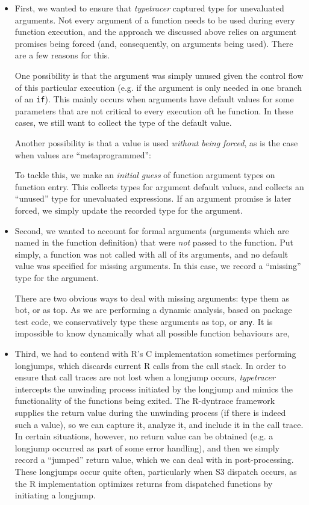 \documentclass[acmsmall,review,anonymous]{acmart}\settopmatter{printfolios=true,printccs=false,printacmref=false}
\newcommand{\code}[1]{{\lstinline[style=Rin]!#1!}\xspace}
\newcommand{\typetracer}{\emph{typetracer}\xspace} %
\begin{document}
\begin{itemize}

\item First, we wanted to ensure that \typetracer captured type for
  unevaluated arguments.  Not every argument of a function needs to be used
  during every function execution, and the approach we discussed above
  relies on argument promises being forced (and, consequently, on arguments
  being used).  There are a few reasons for this.

One possibility is that the argument was simply unused given the control
flow of this particular execution (e.g. if the argument is only needed in
one branch of an \code{if}).  This mainly occurs when arguments have default
values for some parameters that are not critical to every execution oft he
function.  In these cases, we still want to collect the type of the default
value.

Another possibility is that a value is used {\it without being forced}, as
is the case when values are ``metaprogrammed'': 

To tackle this, we make an {\it initial guess} of function argument types on
function entry. This collects types for argument default values, and
collects an ``unused'' type for unevaluated expressions.  If an argument
promise is later forced, we simply update the recorded type for the
argument.

\item Second, we wanted to account for formal arguments (arguments which are
  named in the function definition) that were {\it not} passed to the
  function.  Put simply, a function was not called with all of its
  arguments, and no default value was specified for missing arguments.  In
  this case, we record a ``missing'' type for the argument.

There are two obvious ways to deal with missing arguments: type them as bot,
or as top.  As we are performing a dynamic analysis, based on package test
code, we conservatively type these arguments as top, or \code{any}.  It is
impossible to know dynamically what all possible function behaviours are,

\item Third, we had to contend with R's C implementation sometimes
  performing longjumps, which discards current R calls from the call stack.
  In order to ensure that call traces are not lost when a longjump occurs,
  \typetracer intercepts the unwinding process initiated by the longjump and
  mimics the functionality of the functions being exited.  The R-dyntrace
  framework supplies the return value during the unwinding process (if there
  is indeed such a value), so we can capture it, analyze it, and include it
  in the call trace.  In certain situations, however, no return value can be
  obtained (e.g. a longjump occurred as part of some error handling), and
  then we simply record a ``jumped'' return value, which we can deal with in
  post-processing.  These longjumps occur quite often, particularly when S3
  dispatch occurs, as the R implementation optimizes returns from dispatched
  functions by initiating a longjump.


\end{itemize}
\end{document}
